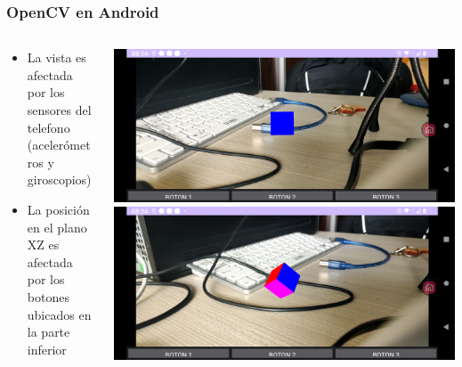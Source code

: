 \documentclass[aspectratio=169,compress]{beamer}
\begin{document}
\begin{frame}[fragile]
\frametitle{OpenCV en Android}
\begin{columns}
\begin{column}{0.48\textwidth}
\begin{itemize}
\item La vista es afectada por los sensores del telefono (acelerómetros y giroscopios)
\item La posición en el plano XZ es afectada por los botones ubicados en la parte inferior
\end{itemize}
\end{column}
\begin{column}{0.48\textwidth}
\includegraphics[width=0.99\linewidth]{PantallazosDemoTaller/Demo15-1.png}
\includegraphics[width=0.99\linewidth]{PantallazosDemoTaller/Demo15-2.png}
\end{column}
\end{columns}

\end{frame}
\end{document}
